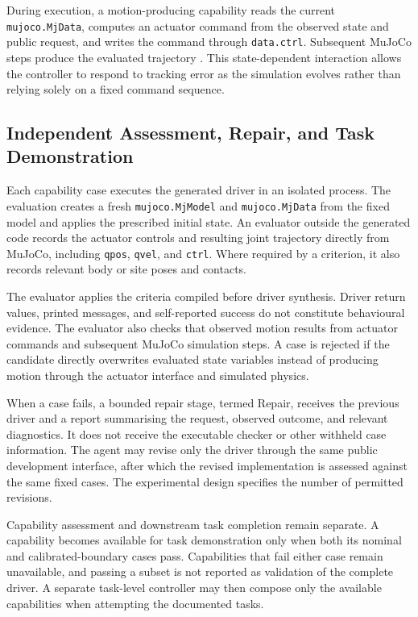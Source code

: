 During execution, a motion-producing capability reads the current
\texttt{mujoco.MjData}, computes an actuator command from the observed state
and public request, and writes the command through \texttt{data.ctrl}.
Subsequent MuJoCo steps produce the evaluated trajectory
\citep{todorov2012mujoco}. This state-dependent interaction allows the
controller to respond to tracking error as the simulation evolves rather than
relying solely on a fixed command sequence.

\subsection{Independent Assessment, Repair, and Task Demonstration}

Each capability case executes the generated driver in an isolated process. The
evaluation creates a fresh \texttt{mujoco.MjModel} and
\texttt{mujoco.MjData} from the fixed model and applies the prescribed initial
state. An evaluator outside the generated code records the actuator controls
and resulting joint trajectory directly from MuJoCo, including
\texttt{qpos}, \texttt{qvel}, and \texttt{ctrl}. Where required by a
criterion, it also records relevant body or site poses and contacts.

The evaluator applies the criteria compiled before driver synthesis. Driver
return values, printed messages, and self-reported success do not constitute
behavioural evidence. The evaluator also checks that observed motion results
from actuator commands and subsequent MuJoCo simulation steps. A case is
rejected if the candidate directly overwrites evaluated state variables instead
of producing motion through the actuator interface and simulated physics.

When a case fails, a bounded repair stage, termed Repair, receives the previous
driver and a report summarising the request, observed outcome, and relevant
diagnostics. It does not receive the executable checker or other withheld case
information. The agent may revise only the driver through the same public
development interface, after which the revised implementation is assessed
against the same fixed cases. The experimental design specifies the number of
permitted revisions.

Capability assessment and downstream task completion remain separate. A
capability becomes available for task demonstration only when both its nominal
and calibrated-boundary cases pass. Capabilities that fail either case remain
unavailable, and passing a subset is not reported as validation of the complete
driver. A separate task-level controller may then compose only the available
capabilities when attempting the documented tasks.

